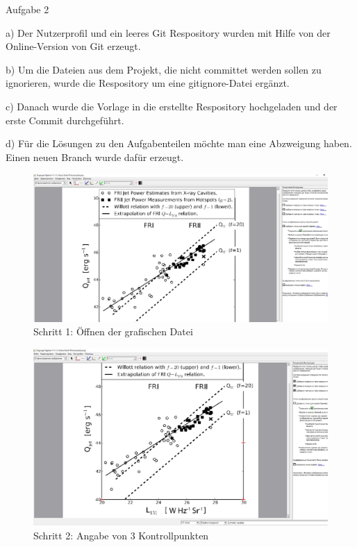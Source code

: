 \documentclass[11pt,
               a4paper,
               parskip=half, style=authoryear, citestyle=authoryear-comp
              bibliography=totoc,
               ]{scrartcl}
\begin{document}
Aufgabe 2

a) Der Nutzerprofil und ein leeres Git Respository wurden mit Hilfe von der Online-Version von Git erzeugt.

b) Um die Dateien aus dem Projekt, die nicht committet werden sollen zu ignorieren, wurde die Respository um eine gitignore-Datei ergänzt.

c) Danach wurde die Vorlage in die erstellte Respository hochgeladen und der erste Commit durchgeführt.

d) Für die Lösungen zu den Aufgabenteilen möchte man eine Abzweigung haben. Einen neuen Branch wurde dafür erzeugt.



\begin{figure}
    \centering
    \includegraphics[scale=0.35]{shag1.jpg}
    \caption{Schritt 1: Öffnen der grafischen Datei}
    \label{fig:my_label}
\end{figure}

\begin{figure}
    \centering
    \includegraphics[scale=0.35]{shag2.jpg}
    \caption{Schritt 2: Angabe von 3 Kontrollpunkten}
    \label{fig:my_label}
\end{figure}
\end{document}
